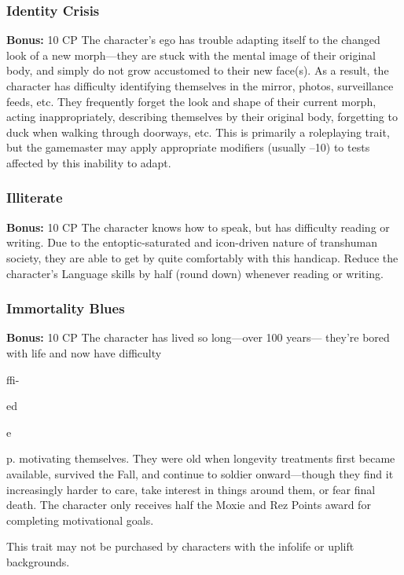 \subsubsection{Identity Crisis}

\textbf{Bonus:} 10 CP
The character's ego has trouble adapting itself to 
the changed look of a new morph—they are stuck 
with the mental image of their original body, and 
simply do not grow accustomed to their new face(s). 
As a result, the character has difficulty  identifying 
themselves in the mirror, photos, surveillance feeds, 
etc. They frequently forget the look and shape of their 
current morph, acting inappropriately, describing 
themselves by their original body, forgetting to duck 
when walking through doorways, etc. This is primarily
a roleplaying trait, but the gamemaster may apply
appropriate modifiers (usually –10) to tests affected 
by this inability to adapt.

\subsubsection{Illiterate}

\textbf{Bonus:} 10 CP
The character knows how to speak, but has difficulty
reading or writing. Due to the entoptic-saturated
and icon-driven nature of transhuman society, they are 
able to get by quite comfortably with this handicap. 
Reduce the character's Language skills by half (round 
down) whenever reading or writing.

\subsubsection{Immortality Blues}

\textbf{Bonus:} 10 CP
The character has lived so long—over 100 years—
they're bored with life and now have difficulty 

ffi-

ed

e

p.
motivating themselves. They were old when longevity 
treatments first became available, survived the Fall, 
and continue to soldier onward—though they find 
it increasingly harder to care, take interest in things 
around them, or fear final death. The character only 
receives half the Moxie and Rez Points award for 
completing motivational goals.

This trait may not be purchased by characters with 
the infolife or uplift backgrounds.

